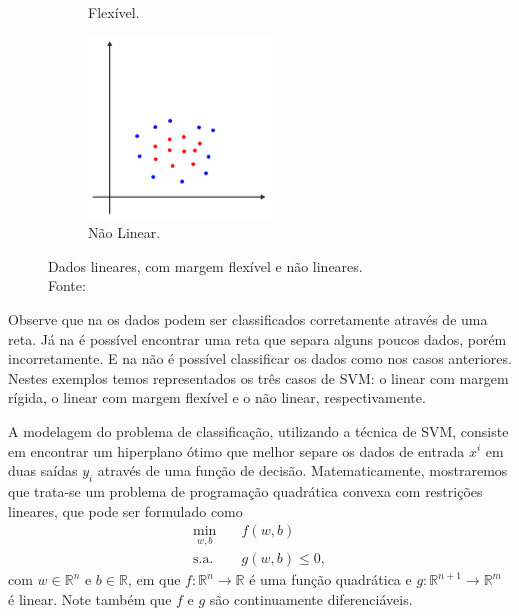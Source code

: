 \documentclass[12pt,a4paper]{scrartcl}
\def\RR{\mathds{R}}
\theoremstyle{definition}%
\begin{document}
\begin{figure}[!h]
\begin{subfigure}[!h]{0.3\textwidth}
	\caption{Flexível. \label{fig1:b}}
\end{subfigure}
\begin{subfigure}[!h]{0.3\textwidth}
	\centering
	\includegraphics[width=\textwidth]{SVM_naolinear}
	\caption{Não Linear. \label{fig1:c}}
\end{subfigure}
\caption{Dados lineares, com margem flexível e não lineares. \label{fig1}\\ Fonte: \textcite{Evelin2017}}
\end{figure}

Observe que na  os dados podem ser classificados corretamente através de uma reta. Já na  é possível encontrar uma reta que separa alguns poucos dados, porém incorretamente. E na  não é possível classificar os dados como nos casos anteriores. Nestes exemplos temos representados os três casos de SVM: o linear com margem rígida, o linear com margem flexível e o não linear, respectivamente.

A modelagem do problema de classificação, utilizando a técnica de SVM, consiste em encontrar um hiperplano ótimo que melhor separe os dados de entrada $x^i$ em duas saídas $y_i$ através de uma função de decisão. Matematicamente, mostraremos que trata-se um problema de programação quadrática convexa com restrições lineares, que pode ser formulado como
\[
\begin{aligned}
\min_{w,b} & \quad f(w,b) \\
\text{s.a.} &  \quad g(w,b) \leq 0, \end{aligned}
\]
com $w\in \RR^n$ e $b\in \RR $, em que $f: \RR^n \rightarrow \RR$ é uma função quadrática e $g: \RR^{n+1} \rightarrow \RR^m$ é linear. Note também que $f$ e $g$ são continuamente diferenciáveis.
\end{document}
